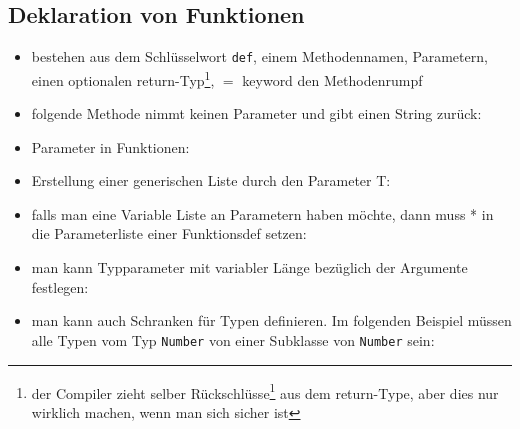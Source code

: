 \subsection{Deklaration von Funktionen}
\begin{itemize}
  \item bestehen aus dem Schlüsselwort \texttt{def}, einem Methodennamen,
  Parametern, einen optionalen return-Typ\footnote{der Compiler zieht selber
  Rückschlüsse\footnote{\textit{infere}} aus dem return-Type, aber dies nur wirklich machen, wenn man
  sich sicher ist}, $=$ keyword \und den Methodenrumpf
  \item folgende Methode nimmt keinen Parameter und gibt einen String zurück:
  
  
  
  \item Parameter in Funktionen:
  
  

  \item Erstellung einer generischen Liste durch den Parameter T:


  
  \item falls man eine Variable Liste an Parametern haben möchte, dann muss *
  in die Parameterliste einer Funktionsdef setzen:
  

  
  \item man kann Typparameter mit variabler Länge bezüglich der Argumente
  festlegen:
  
  
  
  \item man kann auch Schranken für Typen definieren. Im folgenden Beispiel müssen alle Typen vom Typ \texttt{Number} \oder von einer Subklasse von
  \texttt{Number} sein:
  
  
\end{itemize}


